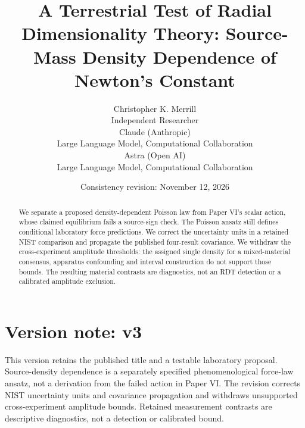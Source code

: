 \documentclass[11pt,a4paper]{article}
\begin{document}
\title{A Terrestrial Test of Radial Dimensionality Theory: Source-Mass Density Dependence of Newton's Constant}
\author{Christopher K. Merrill\\\small Independent Researcher\\[1ex]
Claude (Anthropic)\\\small Large Language Model, Computational Collaboration\\[1ex]
Astra (Open AI)\\\small Large Language Model, Computational Collaboration}
\date{Consistency revision: November 12, 2026}
\maketitle
\begin{abstract}
We separate a proposed density-dependent Poisson law from Paper VI's
scalar action, whose claimed equilibrium fails a source-sign check. The
Poisson ansatz still defines conditional laboratory force predictions.
We correct the uncertainty units in a retained NIST comparison and propagate
the published four-result covariance. We withdraw the cross-experiment
amplitude thresholds: the assigned single density for a mixed-material
consensus, apparatus confounding and interval construction do not support
those bounds. The resulting material contrasts are diagnostics, not an RDT
detection or a calibrated amplitude exclusion.
\end{abstract}

\section*{Version note: v3}
This version retains the published title and a testable laboratory proposal. Source-density dependence is a separately specified phenomenological force-law ansatz, not a derivation from the failed action in Paper VI. The revision corrects NIST uncertainty units and covariance propagation and withdraws unsupported cross-experiment amplitude bounds. Retained measurement contrasts are descriptive diagnostics, not a detection or calibrated bound.
\end{document}
